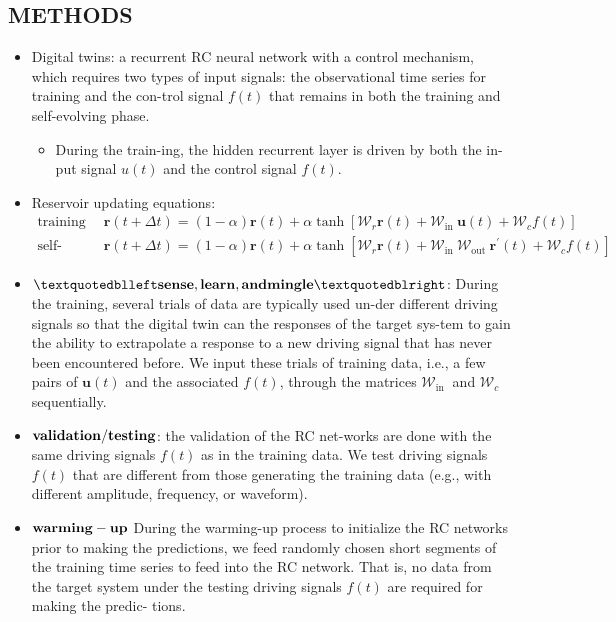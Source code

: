 \subsection{METHODS}
\begin{itemize}
    \item Digital twins: a recurrent RC neural network with a control
    mechanism, which requires two types of input signals:
    the observational time series for training and the con-trol signal $f(t)$ that remains in both the training and
    self-evolving phase. \begin{itemize}
        \item During the train-ing, the hidden recurrent layer is driven by both the in-
        put signal $u(t)$ and the control signal $f(t)$. 
    \end{itemize}
    \item Reservoir updating equations:
    \begin{align}
    \text{training phase: }& \mathbf{r}(t+\Delta t)=(1-\alpha) \mathbf{r}(t) + \alpha \tanh \left[\mathcal{W}_r \mathbf{r}(t)+\mathcal{W}_{\text {in }} \mathbf{u}(t)+\mathcal{W}_c f(t)\right] \\
    \text{self-evolving phase: } & \mathbf{r}(t+\Delta t)=(1-\alpha) \mathbf{r}(t) + \alpha \tanh \left[\mathcal{W}_r \mathbf{r}(t)+\mathcal{W}_{\text {in }} \mathcal{W}_{\text {out }} \mathbf{r}^{\prime}(t)+\mathcal{W}_c f(t)\right]
    \end{align}

    \item $\bold{“sense, learn, and mingle”}$: During
    the training, several trials of data are typically used un-der diﬀerent driving signals so that the digital twin can
    the responses of the target sys-tem to gain the ability to extrapolate a response to a new driving signal that has never been encountered before. We input these trials of training data, i.e., a few pairs of $\mathbf{u}(t)$ and the associated $f(t)$, through the matrices $\mathcal{W}_{\text {in }}$ and $\mathcal{W}_c$ sequentially. 

    \item $\bold{validation/testing}$: the validation of the RC net-works are done with the same driving signals $f(t)$ as in
    the training data. We test driving signals $f(t)$ that are
    diﬀerent from those generating the training data (e.g.,
    with diﬀerent amplitude, frequency, or waveform).  

    \item $\bold{warming-up}$ During the warming-up process to initialize the RC networks prior to making the predictions, we feed randomly chosen short segments of the training time series to feed into the RC network.
    That is, no data from the target system under the testing
    driving signals $f(t)$ are required for making the predic-
    tions.
\end{itemize}


\clearpage
